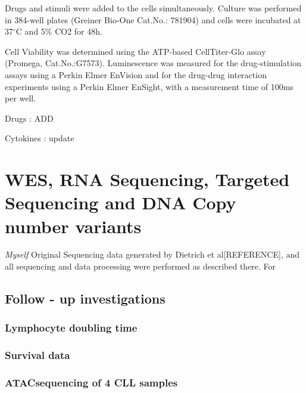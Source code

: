 \documentclass[11pt, a4paper, twosided]{book}
\begin{document}
Drugs and stimuli were added to the cells simultaneously. Culture was performed in 384-well plates (Greiner Bio-One Cat.No.: 781904) and cells were incubated at 37\(^\circ\)C and 5\% CO2 for 48h.

Cell Viability was determined using the ATP-based CellTiter-Glo assay (Promega, Cat.No.:G7573). Luminescence was measured for the drug-stimulation assays using a Perkin Elmer EnVision and for the drug-drug interaction experiments using a Perkin Elmer EnSight, with a measurement time of 100ms per well.

Drugs : ADD

Cytokines : update

\hypertarget{wes-rna-sequencing-targeted-sequencing-and-dna-copy-number-variants}{%
\section{WES, RNA Sequencing, Targeted Sequencing and DNA Copy number variants}\label{wes-rna-sequencing-targeted-sequencing-and-dna-copy-number-variants}}

\emph{Myself} Original
Sequencing data generated by Dietrich et al{[}REFERENCE{]}, and all sequencing and data processing were performed as described there. For

\hypertarget{follow---up-investigations}{%
\subsection{Follow - up investigations}\label{follow---up-investigations}}

\hypertarget{lymphocyte-doubling-time}{%
\subsubsection{Lymphocyte doubling time}\label{lymphocyte-doubling-time}}

\hypertarget{survival-data}{%
\subsubsection{Survival data}\label{survival-data}}

\hypertarget{atacsequencing-of-4-cll-samples}{%
\subsubsection{ATACsequencing of 4 CLL samples}\label{atacsequencing-of-4-cll-samples}}
\end{document}
